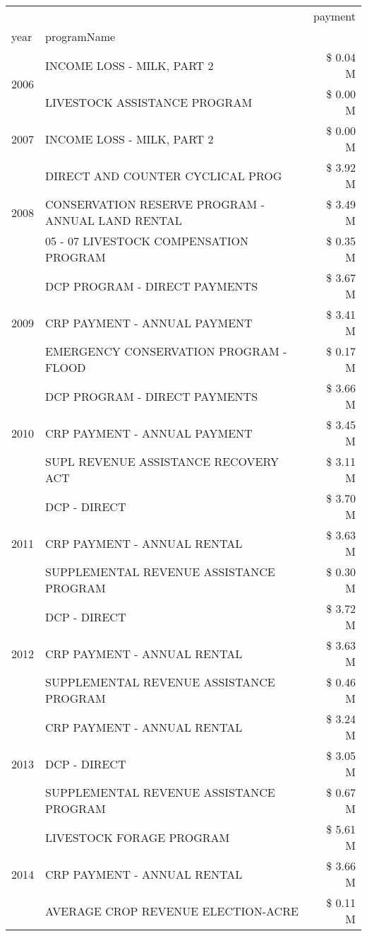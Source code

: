 \begin{tabular}{llr}
\toprule
 &  & payment \\
year & programName &  \\
\midrule
\multirow[t]{2}{*}{2006} & INCOME LOSS - MILK, PART 2 & \$ 0.04 M \\
 & LIVESTOCK ASSISTANCE PROGRAM & \$ 0.00 M \\
\cline{1-3}
2007 & INCOME LOSS - MILK, PART 2 & \$ 0.00 M \\
\cline{1-3}
\multirow[t]{3}{*}{2008} & DIRECT AND COUNTER CYCLICAL PROG & \$ 3.92 M \\
 & CONSERVATION RESERVE PROGRAM - ANNUAL LAND RENTAL & \$ 3.49 M \\
 & 05 - 07 LIVESTOCK COMPENSATION PROGRAM & \$ 0.35 M \\
\cline{1-3}
\multirow[t]{3}{*}{2009} & DCP PROGRAM - DIRECT PAYMENTS & \$ 3.67 M \\
 & CRP PAYMENT - ANNUAL PAYMENT & \$ 3.41 M \\
 & EMERGENCY CONSERVATION PROGRAM - FLOOD & \$ 0.17 M \\
\cline{1-3}
\multirow[t]{3}{*}{2010} & DCP PROGRAM - DIRECT PAYMENTS & \$ 3.66 M \\
 & CRP PAYMENT - ANNUAL PAYMENT & \$ 3.45 M \\
 & SUPL REVENUE ASSISTANCE RECOVERY ACT & \$ 3.11 M \\
\cline{1-3}
\multirow[t]{3}{*}{2011} & DCP - DIRECT & \$ 3.70 M \\
 & CRP PAYMENT - ANNUAL RENTAL & \$ 3.63 M \\
 & SUPPLEMENTAL REVENUE ASSISTANCE PROGRAM & \$ 0.30 M \\
\cline{1-3}
\multirow[t]{3}{*}{2012} & DCP - DIRECT & \$ 3.72 M \\
 & CRP PAYMENT - ANNUAL RENTAL & \$ 3.63 M \\
 & SUPPLEMENTAL REVENUE ASSISTANCE PROGRAM & \$ 0.46 M \\
\cline{1-3}
\multirow[t]{3}{*}{2013} & CRP PAYMENT - ANNUAL RENTAL & \$ 3.24 M \\
 & DCP - DIRECT & \$ 3.05 M \\
 & SUPPLEMENTAL REVENUE ASSISTANCE PROGRAM & \$ 0.67 M \\
\cline{1-3}
\multirow[t]{3}{*}{2014} & LIVESTOCK FORAGE PROGRAM & \$ 5.61 M \\
 & CRP PAYMENT - ANNUAL RENTAL & \$ 3.66 M \\
 & AVERAGE CROP REVENUE ELECTION-ACRE & \$ 0.11 M \\

\end{tabular}
